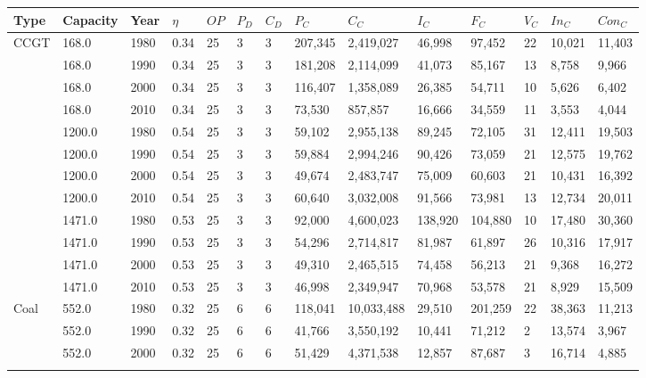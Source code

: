 \begin{table}[]
	\begin{tabular}{|l|l|l|l|l|l|l|l|l|l|l|l|l|l|}
		\hline
		Type & Capacity & Year & $\eta$ & $OP$ & $P_D$ & $C_D$ & $P_C$ & $C_C$ & $I_C$ & $F_C$ & $V_C$ & $In_C$ & $Con_C$ \\ \hline
		\multirow{12}{*}{CCGT} & 168.0 & 1980 & 0.34 & 25 & 3 & 3 & 207,345 & 2,419,027 & 46,998 & 97,452 & 22 & 10,021 & 11,403 \\ \cline{2-14} 
		& 168.0 & 1990 & 0.34 & 25 & 3 & 3 & 181,208 & 2,114,099 & 41,073 & 85,167 & 13 & 8,758 & 9,966 \\ \cline{2-14} 
		& 168.0 & 2000 & 0.34 & 25 & 3 & 3 & 116,407 & 1,358,089 & 26,385 & 54,711 & 10 & 5,626 & 6,402 \\ \cline{2-14} 
		& 168.0 & 2010 & 0.34 & 25 & 3 & 3 & 73,530 & 857,857 & 16,666 & 34,559 & 11 & 3,553 & 4,044 \\ \cline{2-14} 
		& 1200.0 & 1980 & 0.54 & 25 & 3 & 3 & 59,102 & 2,955,138 & 89,245 & 72,105 & 31 & 12,411 & 19,503 \\ \cline{2-14} 
		& 1200.0 & 1990 & 0.54 & 25 & 3 & 3 & 59,884 & 2,994,246 & 90,426 & 73,059 & 21 & 12,575 & 19,762 \\ \cline{2-14} 
		& 1200.0 & 2000 & 0.54 & 25 & 3 & 3 & 49,674 & 2,483,747 & 75,009 & 60,603 & 21 & 10,431 & 16,392 \\ \cline{2-14} 
		& 1200.0 & 2010 & 0.54 & 25 & 3 & 3 & 60,640 & 3,032,008 & 91,566 & 73,981 & 13 & 12,734 & 20,011 \\ \cline{2-14} 
		& 1471.0 & 1980 & 0.53 & 25 & 3 & 3 & 92,000 & 4,600,023 & 138,920 & 104,880 & 10 & 17,480 & 30,360 \\ \cline{2-14} 
		& 1471.0 & 1990 & 0.53 & 25 & 3 & 3 & 54,296 & 2,714,817 & 81,987 & 61,897 & 26 & 10,316 & 17,917 \\ \cline{2-14} 
		& 1471.0 & 2000 & 0.53 & 25 & 3 & 3 & 49,310 & 2,465,515 & 74,458 & 56,213 & 21 & 9,368 & 16,272 \\ \cline{2-14} 
		& 1471.0 & 2010 & 0.53 & 25 & 3 & 3 & 46,998 & 2,349,947 & 70,968 & 53,578 & 21 & 8,929 & 15,509 \\ \hline
		\multirow{24}{*}{Coal} & 552.0 & 1980 & 0.32 & 25 & 6 & 6 & 118,041 & 10,033,488 & 29,510 & 201,259 & 22 & 38,363 & 11,213 \\ \cline{2-14} 
		& 552.0 & 1990 & 0.32 & 25 & 6 & 6 & 41,766 & 3,550,192 & 10,441 & 71,212 & 2 & 13,574 & 3,967 \\ \cline{2-14} 
		& 552.0 & 2000 & 0.32 & 25 & 6 & 6 & 51,429 & 4,371,538 & 12,857 & 87,687 & 3 & 16,714 & 4,885 \\ \cline{2-14} 

\end{tabular}
\end{table}
